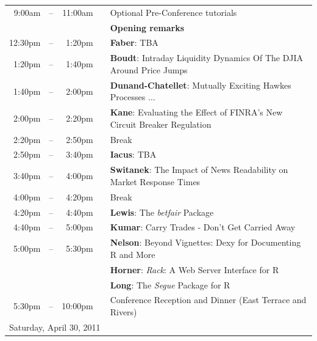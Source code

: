 \documentclass[11pt]{article}
\newcommand{\mylinecolor}[1]{\color{#1}\vspace{-8pt}}  %
\begin{document}
\begin{tabular}{rlrlp{5in}}
  9:00am & -- & 11:00am &   & \small{\mylinecolor{Breaks} Optional Pre-Conference tutorials} \\
  \phantom{X 12:00am}  & \phantom{m} &  & & \textbf{\color{Breaks} Opening remarks} \\
  12:30pm& -- & 1:20pm &    & \textbf{\color{KeynoteTalk} Faber}: \small{TBA} \\
  1:20pm & -- & 1:40pm &    & \textbf{\color{Talk} Boudt}: \small{Intraday Liquidity Dynamics Of The DJIA Around Price Jumps} \\
  1:40pm & -- & 2:00pm &    & \textbf{\color{Talk} Dunand-Chatellet}: \small{Mutually Exciting Hawkes Processes $\ldots$} \\ %
  2:00pm & -- & 2:20pm &    & \textbf{\color{Talk} Kane}: \small{Evaluating the Effect of FINRA's New Circuit Breaker Regulation} \\
  2:20pm & -- & 2:50pm &    & \small{\mylinecolor{Breaks} Break} \\
  2:50pm & -- & 3:40pm &    & \textbf{\color{KeynoteTalk} Iacus}: \small{TBA} \\
  3:40pm & -- & 4:00pm &    & \textbf{\color{Talk} Switanek}: \small{The Impact of News Readability on Market Response Times} \\
  4:00pm & -- & 4:20pm &    & \small{\mylinecolor{Breaks} Break} \\
  4:20pm & -- & 4:40pm &    & \textbf{\color{Talk} Lewis}: \small{The \emph{betfair} Package} \\
  4:40pm & -- & 5:00pm &    & \textbf{\color{Talk} Kumar}: \small{Carry Trades - Don't Get Carried Away} \\
  5:00pm & -- & 5:30pm &    & \textbf{\color{LightningTalk} Nelson}: \small{Beyond Vignettes: Dexy for Documenting R and More} \\
         &    &        &    & \textbf{\color{LightningTalk} Horner}: \small{\emph{Rack}: A Web Server Interface for R} \\
         &    &        &    & \textbf{\color{LightningTalk} Long}: \small{The \emph{Segue} Package for R} \\
  5:30pm & -- & 10:00pm &    & \small{\mylinecolor{Breaks} Conference Reception and Dinner (East Terrace and Rivers)}  \\[12pt]

  \multicolumn{5}{l}{\large Saturday, April 30, 2011} \\


\end{tabular}
\end{document}
